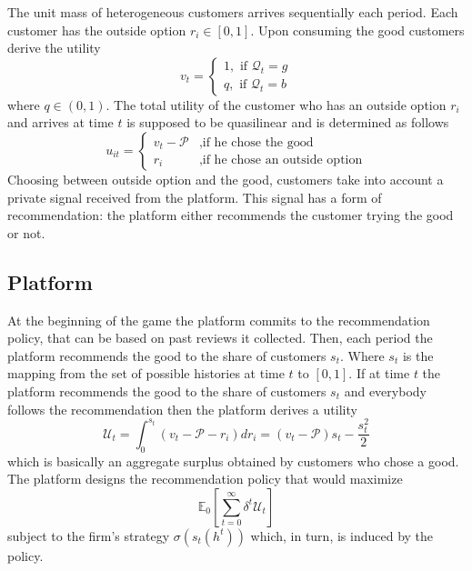 \documentclass[a4paper]{article}
\newcommand{\expect}{\mathbb{E}}
\begin{document}
	
	The unit mass of heterogeneous customers arrives sequentially each period. Each customer has the outside option $r_i \in [0, 1]$. Upon consuming the good customers derive the utility $$v_t = \begin{cases}
	1, \text{ if }\mathcal{Q}_t = g\\
	q, \text{ if }\mathcal{Q}_t = b
	\end{cases}$$
	where $q \in (0, 1)$. The total utility of the customer who has an outside option $r_i$ and arrives at time $t$ is supposed to be quasilinear and is determined as follows $$u_{it} = \begin{cases}
	v_t - \mathcal{P}&,\text{if he chose the good}\\
	r_{i} &,\text{if he chose an outside option}
	\end{cases}$$
	Choosing between outside option and the good, customers take into account a private signal received from the platform. This signal has a form of recommendation: the platform either recommends the customer trying the good or not. 
	\subsection{Platform}
	At the beginning of the game the platform commits to the recommendation policy, that can be based on past reviews it collected. Then, each period the platform recommends the good to the share of customers $s_t$. Where $s_t$ is the mapping from the set of possible histories at time $t$ to $[0, 1]$. If at time $t$ the platform recommends the good to the share of customers $s_t$ and everybody follows the recommendation then the platform derives a utility $$\mathcal{U}_t = \int_{0}^{s_t} (v_t - \mathcal{P} - r_i)dr_i =  (v_t - \mathcal{P})s_t - \frac{s_t^2}{2}$$ which is basically an aggregate surplus obtained by customers who chose a good. The platform designs the recommendation policy that would maximize $$\expect_0\left[\sum_{t=0}^{\infty} \delta^t \mathcal{U}_t\right]$$ subject to the firm's strategy $\sigma(s_t(h^t))$ which, in turn, is induced by the policy.
\end{document}
